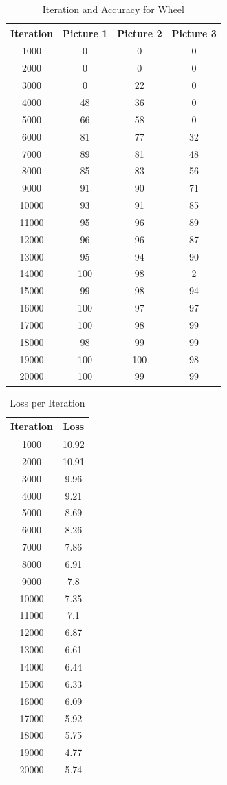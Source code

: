 \begin{table}[h!]
\centering
\begin{tabular}{|c|c|c|c|}
\hline
\textbf{Iteration} & \textbf{Picture 1} & \textbf{Picture 2} & \textbf{Picture 3} \\
\hline
1000 & 0 & 0 & 0 \\
2000 & 0 & 0 & 0 \\
3000 & 0 & 22 & 0 \\
4000 & 48 & 36 & 0 \\
5000 & 66 & 58 & 0 \\
6000 & 81 & 77 & 32 \\
7000 & 89 & 81 & 48 \\
8000 & 85 & 83 & 56 \\
9000 & 91 & 90 & 71 \\
10000 & 93 & 91 & 85 \\
11000 & 95 & 96 & 89 \\
12000 & 96 & 96 & 87 \\
13000 & 95 & 94 & 90 \\
14000 & 100 & 98 & 2 \\
15000 & 99 & 98 & 94 \\
16000 & 100 & 97 & 97 \\
17000 & 100 & 98 & 99 \\
18000 & 98 & 99 & 99 \\
19000 & 100 & 100 & 98 \\
20000 & 100 & 99 & 99 \\
\hline
\end{tabular}
\caption{Iteration and Accuracy for Wheel}
\end{table}


\begin{table}[h!]
\centering
\begin{tabular}{|c|c|}
\hline
\textbf{Iteration} & \textbf{Loss} \\
\hline
1000 & 10.92 \\
2000 & 10.91 \\
3000 & 9.96 \\
4000 & 9.21 \\
5000 & 8.69 \\
6000 & 8.26 \\
7000 & 7.86 \\
8000 & 6.91 \\
9000 & 7.8 \\
10000 & 7.35 \\
11000 & 7.1 \\
12000 & 6.87 \\
13000 & 6.61 \\
14000 & 6.44 \\
15000 & 6.33 \\
16000 & 6.09 \\
17000 & 5.92 \\
18000 & 5.75 \\
19000 & 4.77 \\
20000 & 5.74 \\
\hline
\end{tabular}
\caption{Loss per Iteration}
\end{table}

